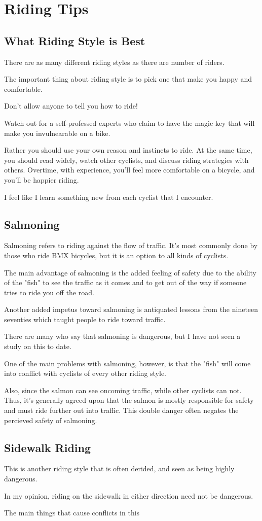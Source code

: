 \chapter{Riding Tips}

\section{What Riding Style is Best}

There are as many different riding styles as there are number of riders.

The important thing about riding style is to pick one that make you happy and comfortable.

Don't allow anyone to tell you how to ride!

Watch out for a self-professed experts who claim to have the magic key that will make you invulnearable on a bike.

Rather you should use your own reason and instincts to ride. At the same time,
you should read widely, watch other cyclists, and discuss riding strategies
with others. Overtime, with experience, you'll feel more comfortable on a
bicycle, and you'll be happier riding.

I feel like I learn something new from each cyclist that I encounter. 

\section{Salmoning}

Salmoning refers to riding against the flow of traffic. It's most commonly done
by those who ride BMX bicycles, but it is an option to all kinds of cyclists.

The main advantage of salmoning is the added feeling of safety due to the
ability of the "fish" to see the traffic as it comes and to get out of the way
if someone tries to ride you off the road.

Another added impetus toward salmoning is antiquated lessons from the
nineteen seventies which taught people to ride toward traffic.  

There are many who say that salmoning is dangerous, but I have not seen a study on this to date.

One of the main problems with salmoning, however, is that the "fish" will come
into conflict with cyclists of every other riding style. 

Also, since the salmon can see oncoming traffic, while other cyclists can not.
Thus, it's generally agreed upon that the salmon is mostly responsible for
safety and must ride further out into traffic. This double danger often negates
the percieved safety of salmoning. 

\section{Sidewalk Riding}

This is another riding style that is often derided, and seen as being highly dangerous.


In my opinion, riding on the sidewalk in either direction need not be dangerous.

The main things that cause conflicts in this   
